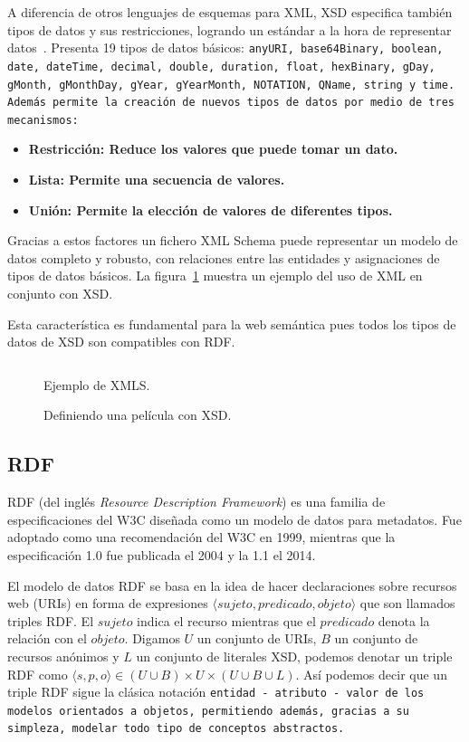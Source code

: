 A diferencia de otros lenguajes de esquemas para XML, XSD especifica también
tipos de datos y sus restricciones, logrando un estándar a la hora de
representar datos~\cite{biron2004xml}. 
Presenta 19 tipos de datos básicos: \tt{anyURI},
\tt{base64Binary}, \tt{boolean}, \tt{date}, \tt{dateTime}, \tt{decimal},
\tt{double}, \tt{duration}, \tt{float}, \tt{hexBinary}, \tt{gDay}, \tt{gMonth},
\tt{gMonthDay}, \tt{gYear}, \tt{gYearMonth}, \tt{NOTATION}, \tt{QName},
\tt{string} y \tt{time}. Además permite la creación de nuevos tipos de datos por
medio de tres mecanismos:
\begin{itemize}
  \item \bf{Restricción:} Reduce los valores que puede tomar un dato.
  \item \bf{Lista:} Permite una secuencia de valores.
  \item \bf{Unión:} Permite la elección de valores de diferentes tipos.
\end{itemize}

Gracias a estos factores un fichero XML Schema puede representar un modelo de
datos completo y robusto, con relaciones entre las entidades y asignaciones de 
tipos de datos básicos. La figura~\ref{fig:xsdex} muestra un ejemplo del uso de
XML en conjunto con XSD.

Esta característica es fundamental para la web semántica pues todos los tipos de
datos de XSD son compatibles con RDF.

\begin{figure}[htpb]
  \centering
  \begin{tabular}{c}
    
  \end{tabular}
  \caption{Ejemplo de XMLS.}
  \vspace{-.25cm}
  \caption*{Definiendo una película con XSD.}
  \label{fig:xsdex}
\end{figure}

\subsection{RDF}
RDF (del inglés \emph{Resource Description Framework}) es una familia de
especificaciones del W3C diseñada como un modelo de datos para metadatos.
Fue adoptado como una recomendación del W3C en 1999, mientras que la
especificación 1.0 fue publicada el 2004 y la 1.1 el
2014\cite{bikakis2013semantic}.

El modelo de datos RDF se basa en la idea de hacer declaraciones sobre 
recursos web (URIs) en forma de expresiones $\langle sujeto, predicado, objeto
\rangle$ que son llamados triples RDF.
El $sujeto$ indica el recurso mientras que el $predicado$ denota la relación
con el $objeto$.
Digamos $U$ un conjunto de URIs, $B$ un conjunto de recursos anónimos y $L$ un
conjunto de literales XSD, podemos denotar un triple RDF como 
$\langle s,p,o\rangle \in (U\cup B) \times U \times (U\cup B\cup L)$.
Así podemos decir que un triple RDF sigue la clásica notación \tt{entidad} - 
\tt{atributo} - \tt{valor} de los modelos orientados a objetos, permitiendo
además, gracias a su simpleza, modelar todo tipo de conceptos abstractos.

